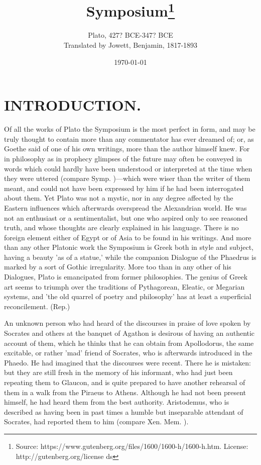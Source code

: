 \documentclass[11pt,letter]{article}
\begin{document}
\title{Symposium\thanks{Source: https://www.gutenberg.org/files/1600/1600-h/1600-h.htm. License: http://gutenberg.org/license ds}}
\date{\today}
\author{Plato, 427? BCE-347? BCE\\ Translated by Jowett, Benjamin, 1817-1893}
\maketitle

\setcounter{tocdepth}{1}
\tableofcontents
\renewcommand{\baselinestretch}{1.0}
\normalsize
\newpage

\section{
      INTRODUCTION.
    }
\par  Of all the works of Plato the Symposium is the most perfect in form, and may be truly thought to contain more than any commentator has ever dreamed of; or, as Goethe said of one of his own writings, more than the author himself knew. For in philosophy as in prophecy glimpses of the future may often be conveyed in words which could hardly have been understood or interpreted at the time when they were uttered (compare Symp. )—which were wiser than the writer of them meant, and could not have been expressed by him if he had been interrogated about them. Yet Plato was not a mystic, nor in any degree affected by the Eastern influences which afterwards overspread the Alexandrian world. He was not an enthusiast or a sentimentalist, but one who aspired only to see reasoned truth, and whose thoughts are clearly explained in his language. There is no foreign element either of Egypt or of Asia to be found in his writings. And more than any other Platonic work the Symposium is Greek both in style and subject, having a beauty 'as of a statue,' while the companion Dialogue of the Phaedrus is marked by a sort of Gothic irregularity. More too than in any other of his Dialogues, Plato is emancipated from former philosophies. The genius of Greek art seems to triumph over the traditions of Pythagorean, Eleatic, or Megarian systems, and 'the old quarrel of poetry and philosophy' has at least a superficial reconcilement. (Rep.)

\par  An unknown person who had heard of the discourses in praise of love spoken by Socrates and others at the banquet of Agathon is desirous of having an authentic account of them, which he thinks that he can obtain from Apollodorus, the same excitable, or rather 'mad' friend of Socrates, who is afterwards introduced in the Phaedo. He had imagined that the discourses were recent. There he is mistaken: but they are still fresh in the memory of his informant, who had just been repeating them to Glaucon, and is quite prepared to have another rehearsal of them in a walk from the Piraeus to Athens. Although he had not been present himself, he had heard them from the best authority. Aristodemus, who is described as having been in past times a humble but inseparable attendant of Socrates, had reported them to him (compare Xen. Mem. ).
\end{document}
